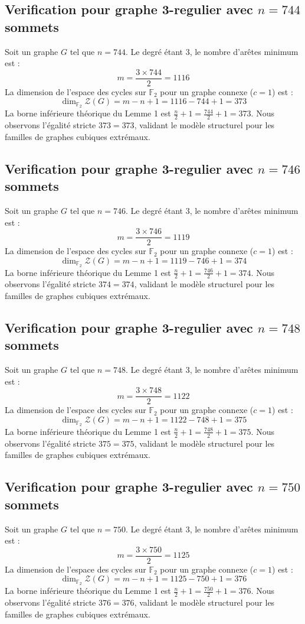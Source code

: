 \documentclass[11pt,a4paper]{article}
\begin{document}
\subsection{Verification pour graphe 3-regulier avec $n=744$ sommets}
Soit un graphe $G$ tel que $n = 744$. Le degré étant 3, le nombre d'arêtes minimum est :
$$ m = \frac{3 \times 744}{2} = 1116 $$
La dimension de l'espace des cycles sur $\mathbb{F}_2$ pour un graphe connexe ($c=1$) est :
$$ \dim_{\mathbb{F}_2} \mathcal{Z}(G) = m - n + 1 = 1116 - 744 + 1 = 373 $$
La borne inférieure théorique du Lemme 1 est $\frac{n}{2} + 1 = \frac{744}{2} + 1 = 373$.
Nous observons l'égalité stricte $373 = 373$, validant le modèle structurel pour les familles de graphes cubiques extrémaux.

\subsection{Verification pour graphe 3-regulier avec $n=746$ sommets}
Soit un graphe $G$ tel que $n = 746$. Le degré étant 3, le nombre d'arêtes minimum est :
$$ m = \frac{3 \times 746}{2} = 1119 $$
La dimension de l'espace des cycles sur $\mathbb{F}_2$ pour un graphe connexe ($c=1$) est :
$$ \dim_{\mathbb{F}_2} \mathcal{Z}(G) = m - n + 1 = 1119 - 746 + 1 = 374 $$
La borne inférieure théorique du Lemme 1 est $\frac{n}{2} + 1 = \frac{746}{2} + 1 = 374$.
Nous observons l'égalité stricte $374 = 374$, validant le modèle structurel pour les familles de graphes cubiques extrémaux.

\subsection{Verification pour graphe 3-regulier avec $n=748$ sommets}
Soit un graphe $G$ tel que $n = 748$. Le degré étant 3, le nombre d'arêtes minimum est :
$$ m = \frac{3 \times 748}{2} = 1122 $$
La dimension de l'espace des cycles sur $\mathbb{F}_2$ pour un graphe connexe ($c=1$) est :
$$ \dim_{\mathbb{F}_2} \mathcal{Z}(G) = m - n + 1 = 1122 - 748 + 1 = 375 $$
La borne inférieure théorique du Lemme 1 est $\frac{n}{2} + 1 = \frac{748}{2} + 1 = 375$.
Nous observons l'égalité stricte $375 = 375$, validant le modèle structurel pour les familles de graphes cubiques extrémaux.

\subsection{Verification pour graphe 3-regulier avec $n=750$ sommets}
Soit un graphe $G$ tel que $n = 750$. Le degré étant 3, le nombre d'arêtes minimum est :
$$ m = \frac{3 \times 750}{2} = 1125 $$
La dimension de l'espace des cycles sur $\mathbb{F}_2$ pour un graphe connexe ($c=1$) est :
$$ \dim_{\mathbb{F}_2} \mathcal{Z}(G) = m - n + 1 = 1125 - 750 + 1 = 376 $$
La borne inférieure théorique du Lemme 1 est $\frac{n}{2} + 1 = \frac{750}{2} + 1 = 376$.
Nous observons l'égalité stricte $376 = 376$, validant le modèle structurel pour les familles de graphes cubiques extrémaux.
\end{document}
